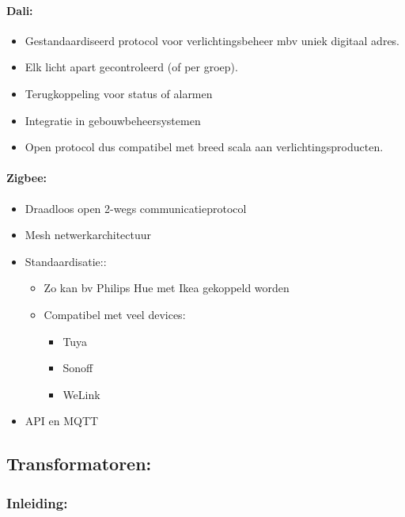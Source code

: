 \documentclass[12pt]{article}
\begin{document}
\paragraph{Dali:}\begin{itemize}
    \item Gestandaardiseerd protocol voor verlichtingsbeheer mbv uniek digitaal adres.
    \item Elk licht apart gecontroleerd (of per groep).
    \item Terugkoppeling voor status of alarmen
    \item Integratie in gebouwbeheersystemen
    \item Open protocol dus compatibel met breed scala aan
    verlichtingsproducten.
\end{itemize}
\paragraph{Zigbee:}\begin{itemize}
    \item Draadloos open 2-wegs communicatieprotocol
    \item Mesh netwerkarchitectuur
    \item Standaardisatie::\begin{itemize}
        \item Zo kan bv Philips Hue met Ikea gekoppeld worden
        \item Compatibel met veel devices:\begin{itemize}
            \item Tuya
            \item Sonoff
            \item WeLink
        \end{itemize}
    \end{itemize}
    \item API en MQTT
\end{itemize}
\subsection{Transformatoren:}
\subsubsection{Inleiding:}
\end{document}
